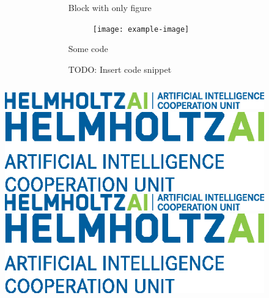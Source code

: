 \documentclass[aspectratio=1610]{beamer}
\begin{document}
\begin{frame}{}
\begin{columns}[t]
\begin{column}{.5\linewidth}
        \end{column}
        \begin{column}{.5\linewidth}
        
            \begin{haiblock}{Block with only figure}

            \begin{figure}
                \centering
                \texttt{[image: example-image]}
            \end{figure}
            \end{haiblock}
            
            \begin{haiblock}{Some code}

                TODO: Insert code snippet

            \end{haiblock}
            
        \end{column}
    \end{columns}
    
    \vfill
    \begin{figure}[b]
        \centering
        \includegraphics[height=0.055\textheight]{logos/helmholtzai_logo_2_lines.eps}%
        \hfill%
        \includegraphics[height=0.055\textheight]{logos/helmholtzai_logo_3_lines.eps}%
        \hfill%
        \includegraphics[height=0.055\textheight]{logos/helmholtzai_logo_2_lines.eps}%
        \hfill%
        \includegraphics[height=0.055\textheight]{logos/helmholtzai_logo_3_lines.eps}%
    \end{figure}
    
  \end{frame}

 
\end{document}
